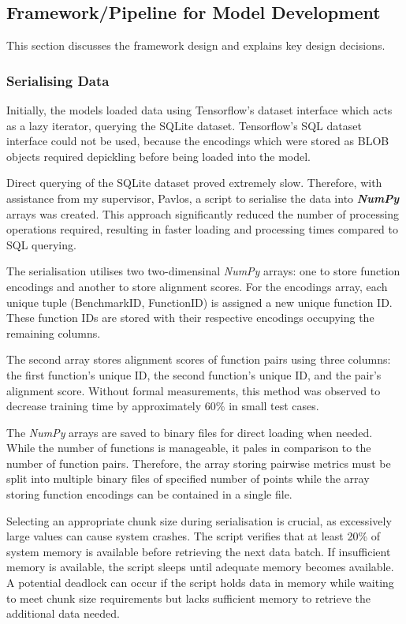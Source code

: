 \subsection{Framework/Pipeline for Model Development}
This section discusses the framework design and explains key design decisions.

\subsubsection{Serialising Data}
Initially, the models loaded data using Tensorflow's dataset interface which acts as a lazy iterator, querying the SQLite dataset. Tensorflow's SQL dataset interface could not be used, because the encodings which were stored as BLOB objects required depickling before being loaded into the model.

Direct querying of the SQLite dataset proved extremely slow. Therefore, with assistance from my supervisor, Pavlos, a script to serialise the data into \textbf{\textit{NumPy}} arrays was created. This approach significantly reduced the number of processing operations required, resulting in faster loading and processing times compared to SQL querying.

The serialisation utilises two two-dimensinal \textit{NumPy} arrays: one to store function encodings and another to store alignment scores. For the encodings array, each unique tuple (BenchmarkID, FunctionID) is assigned a new unique function ID. These function IDs are stored with their respective encodings occupying the remaining columns.

The second array stores alignment scores of function pairs using three columns: the first function's unique ID, the second function's unique ID, and the pair's alignment score. Without formal measurements, this method was observed to decrease training time by approximately 60\% in small test cases.

The \textit{NumPy} arrays are saved to binary files for direct loading when needed. While the number of functions is manageable, it pales in comparison to the number of function pairs. Therefore, the array storing pairwise metrics must be split into multiple binary files of specified number of points while the array storing function encodings can be contained in a single file.

Selecting an appropriate chunk size during serialisation is crucial, as excessively large values can cause system crashes. The script verifies that at least 20\% of system memory is available before retrieving the next data batch. If insufficient memory is available, the script sleeps until adequate memory becomes available. A potential deadlock can occur if the script holds data in memory while waiting to meet chunk size requirements but lacks sufficient memory to retrieve the additional data needed.

